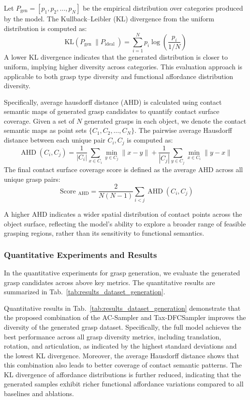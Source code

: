 Let $P_{\mathrm{gen}}=\left[p_1, p_2, \ldots, p_N\right]$ be the empirical distribution over categories produced by the model. The Kullback–Leibler (KL) divergence from the uniform distribution is computed as:
\begin{equation}
\mathrm{KL}\left(P_{\text {gen }} \| P_{\text {ideal }}\right)=\sum_{i=1}^N p_i \log \left(\frac{p_i}{1 / N}\right)
\end{equation}
A lower KL divergence indicates that the generated distribution is closer to uniform, implying higher diversity across categories. This evaluation approach is applicable to both grasp type diversity and functional affordance distribution diversity.

Specifically, average hausdorff distance (AHD) is calculated using contact semantic maps of generated grasp candidates to quantify contact surface coverage. 
Given a set of $N$ generated grasps in each object, we denote the contact semantic maps as point sets $\{C_1, C_2,\dots, C_{N}\}$. The pairwise average Hausdorff distance between each unique pair $C_i, C_j$ is computed as:
 \begin{equation}
\operatorname{AHD}\left(C_i, C_j\right)=\frac{1}{\left|C_i\right|} \sum_{x \in C_i} \min _{y \in C_j}\|x-y\|+\frac{1}{\left|C_j\right|} \sum_{y \in C_j} \min _{x \in C_i}\|y-x\|
\end{equation}
The final contact surface coverage score is defined as the average AHD across all unique grasp pairs:
\begin{equation}
\text { Score }_{\mathrm{AHD}}=\frac{2}{N(N-1)} \sum_{i<j} \operatorname{AHD}\left(C_i, C_j\right)
\end{equation}


A higher AHD indicates a wider spatial distribution of contact points across the object surface, reflecting the model’s ability to explore a broader range of feasible grasping regions, rather than its sensitivity to functional semantics.


\subsubsection{Quantitative Experiments and Results}
In the quantitative experiments for grasp generation, we evaluate the generated grasp candidates across above key metrics. 
The quantitative results are summarized in Tab.~\ref{tab:results_dataset_generation}. 


Quantitative results in Tab.~\ref{tab:results_dataset_generation} demonstrate that the proposed combination of the AC-Sampler and Tax-DFCSampler improves the diversity of the generated grasp dataset. Specifically, the full model achieves the best performance across all grasp diversity metrics, including translation, rotation, and articulation, as indicated by the highest standard deviations and the lowest KL divergence.  
Moreover, the average Hausdorff distance shows that this combination also leads to better coverage of contact semantic patterns. 
The KL divergence of affordance distributions is further reduced, indicating that the generated samples exhibit richer functional affordance variations compared to all baselines and ablations. 

